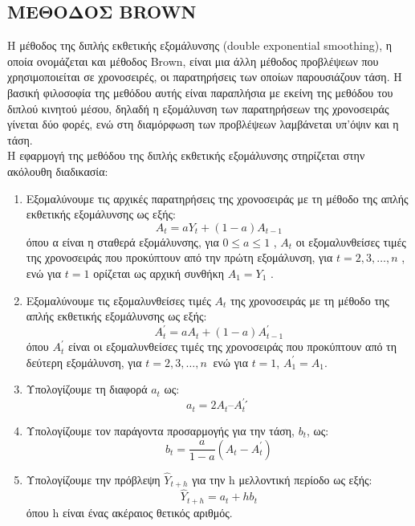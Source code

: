 \subsection{ΜΕΘΟΔΟΣ BROWN}
Η μέθοδος της διπλής εκθετικής εξομάλυνσης (double exponential smoothing), η
οποία ονομάζεται και μέθοδος Brown, είναι μια άλλη μέθοδος προβλέψεων που
χρησιμοποιείται σε χρονοσειρές, οι παρατηρήσεις των οποίων παρουσιάζουν τάση. Η
βασική φιλοσοφία της μεθόδου αυτής είναι παραπλήσια με εκείνη της μεθόδου του
διπλού κινητού μέσου, δηλαδή η εξομάλυνση των παρατηρήσεων της χρονοσειράς
γίνεται δύο φορές, ενώ στη διαμόρφωση των προβλέψεων λαμβάνεται υπ’όψιν και η
τάση.\\

Η εφαρμογή της μεθόδου της διπλής εκθετικής εξομάλυνσης στηρίζεται στην
ακόλουθη διαδικασία:\\
\begin{enumerate}
\item  Εξομαλύνουμε τις αρχικές παρατηρήσεις της χρονοσειράς με τη μέθοδο της απλής
εκθετικής εξομάλυνσης ως εξής:\\
$$ A_t=aY_t + \left(1-a\right) A_{t-1} $$
όπου α είναι η σταθερά εξομάλυνσης, για $ 0 \leq a \leq 1 $ , $ A_t $ οι εξομαλυνθείσες τιμές της
χρονοσειράς που προκύπτουν από την πρώτη εξομάλυνση, για $ t = 2,3,\ldots,n $ , ενώ για
$t=1$ ορίζεται ως αρχική συνθήκη $ A_1 = Y_1 $ .

\item Εξομαλύνουμε τις εξομαλυνθείσες τιμές $A_t$ της χρονοσειράς με τη μέθοδο της
απλής εκθετικής εξομάλυνσης ως εξής:\\
$$ A^{'}_t=aA_t + \left(1-a\right) A^{'}_{t-1} $$
όπου $A^{'}_t$ είναι οι εξομαλυνθείσες τιμές της χρονοσειράς που προκύπτουν από τη
δεύτερη εξομάλυνση, για $t = 2,3,\dots,n\:$ ενώ για $t=1$, $A^{'}_1 =A_1$.

\item Υπολογίζουμε τη διαφορά $a_t$ ως:
$$a_t = 2 A_t – A^{'}_t ́$$

\item Υπολογίζουμε τον παράγοντα προσαρμογής για την τάση, $b_t$, ως:\\
$$ b_t=\frac{a}{1-a} \left(A_t - A^{'}_t \right) $$

\item Υπολογίζουμε την πρόβλεψη $ \widehat{Y}_{t+h} $ για την h μελλοντική περίοδο ως εξής:\\
$$ \widehat{Y}_{t+h}=a_t+hb_t  $$
όπου h είναι ένας ακέραιος θετικός αριθμός.\\
 
\end{enumerate}

